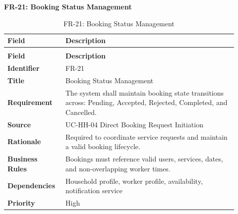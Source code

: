 \documentclass[12pt,a4paper]{article}
\begin{document}
\noindent\textbf{FR-21: Booking Status Management}\par
\vspace{4pt}
\begingroup\small\setlength{\tabcolsep}{4pt}\renewcommand{\arraystretch}{1.15}
\begin{longtable}{|>{\raggedright\arraybackslash}p{0.22\linewidth}|>{\raggedright\arraybackslash}p{0.70\linewidth}|}
\caption{FR-21: Booking Status Management}\label{tab:fr-21}\\
\hline
\textbf{Field} & \textbf{Description} \\ \hline
\endfirsthead
\multicolumn{2}{c}{Table \thetable\ Booking Status Management (continued)}\\
\hline
\textbf{Field} & \textbf{Description} \\ \hline
\endhead
\textbf{Identifier} & FR-21 \\ \hline
\textbf{Title} & Booking Status Management \\ \hline
\textbf{Requirement} & The system shall maintain booking state transitions across: Pending, Accepted, Rejected, Completed, and Cancelled. \\ \hline
\textbf{Source} & UC-HH-04 Direct Booking Request Initiation \\ \hline
\textbf{Rationale} & Required to coordinate service requests and maintain a valid booking lifecycle. \\ \hline
\textbf{Business Rules} & Bookings must reference valid users, services, dates, and non-overlapping worker times. \\ \hline
\textbf{Dependencies} & Household profile, worker profile, availability, notification service \\ \hline
\textbf{Priority} & High \\ \hline
\end{longtable}
\endgroup
\end{document}

